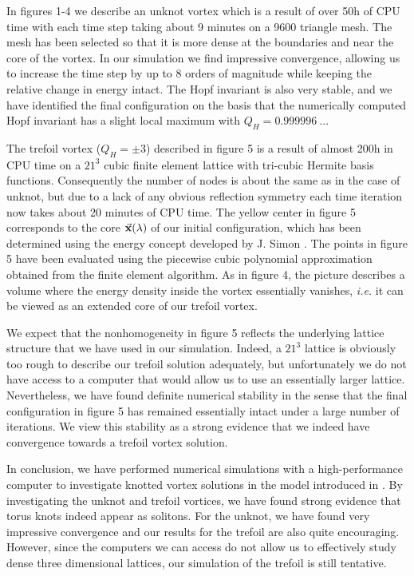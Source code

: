 In figures 1-4 we describe an unknot vortex
which is a result of over 50h of CPU time with
each time step taking about 9 minutes
on a 9600 triangle mesh. 
The mesh has been selected so that it is 
more dense at the boundaries and
near the core of the vortex. 
In our simulation we find impressive convergence,
allowing us to increase the time step by up to
8 orders of magnitude while keeping the relative
change in energy intact. The Hopf invariant
is also very stable, and we have identified
the final configuration on the basis that the
numerically computed Hopf invariant has 
a slight local maximum with $Q_H = 0.999996 \ ...$

\vskip 0.3cm
The trefoil vortex ($Q_H = \pm 3$)
described in figure 5 is a result
of almost 200h in CPU time on a $21^3$ cubic 
finite element lattice with tri-cubic 
Hermite basis functions. Consequently 
the number of nodes is about the same
as in the case of unknot, but due to a lack
of any obvious reflection symmetry each time iteration
now takes about 20 minutes of CPU time.
The yellow center in figure 5 corresponds to
the core $\vec{\bf x}(\lambda)$ of our initial 
configuration, which has been determined using the 
energy concept developed by J. Simon 
\cite{simon}. The points in figure 5 have been 
evaluated using the piecewise cubic polynomial
approximation obtained from the finite
element algorithm. 
As in figure 4, the picture 
describes
a volume where the
energy density inside the vortex essentially
vanishes, {\it i.e.} it 
can be viewed as an extended core
of our trefoil vortex. 

We expect that the nonhomogeneity
in figure 5 
reflects the underlying lattice structure that
we have used in our
simulation.
Indeed, a $21^3$ lattice is obviously too rough to
describe our trefoil solution adequately, but 
unfortunately
we do not have access to a computer that would
allow us to use an essentially larger lattice.
Nevertheless, we have found definite numerical 
stability in the sense that the final 
configuration in figure 5 has remained essentially 
intact under a large number of iterations. 
We view this stability as a strong evidence that
we indeed have convergence towards a trefoil
vortex solution.
 
\vskip 0.4cm
In conclusion, we have performed numerical
simulations with a high-performance computer
to investigate knotted vortex solutions
in the model introduced in \cite{fadde2}. 
By investigating the unknot
and trefoil vortices, we
have found strong evidence that torus knots 
indeed appear as solitons.
For the unknot, we have found very impressive
convergence and our results for the trefoil are
also quite encouraging. However, since the
computers we can access do not allow us to
effectively study dense
three dimensional lattices,  our simulation of 
the trefoil is still tentative.


